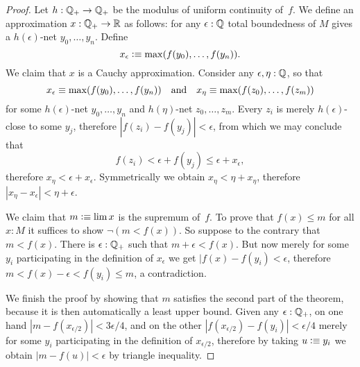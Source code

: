 \begin{proof}
  Let $h : \mathbb{Q}_{+} \to \mathbb{Q}_{+}$ be the modulus of uniform continuity of~$f$.
  We define an approximation $x : \mathbb{Q}_{+} \to \mathbb{R}$ as follows: for any $\epsilon : \mathbb{Q}$ total
  boundedness of $M$ gives a $h(\epsilon)$-net $y_0, \ldots, y_n$. Define
  \begin{equation*}
    x_\epsilon \vcentcolon\equiv \max (f(y_0), \ldots, f(y_n)).
  \end{equation*}
  We claim that $x$ is a Cauchy approximation. Consider any $\epsilon, \eta : \mathbb{Q}$, so that
  \begin{equation*}
    x_\epsilon \equiv \max (f(y_0), \ldots, f(y_n))
    \quad\text{and}\quad
    x_\eta \equiv \max (f(z_0), \ldots, f(z_m))
  \end{equation*}
  for some $h(\epsilon)$-net $y_0, \ldots, y_n$ and $h(\eta)$-net $z_0, \ldots, z_m$.
  Every $z_i$ is merely $h(\epsilon)$-close to some $y_j$, therefore $|f(z_i) - f(y_j)| <
  \epsilon$, from which we may conclude that
  \begin{equation*}
    f(z_i) < \epsilon + f(y_j) \leq \epsilon + x_\epsilon,
  \end{equation*}
  therefore $x_\eta < \epsilon + x_\epsilon$. Symmetrically we obtain $x_\eta < \eta +
  x_\eta$, therefore $|x_\eta - x_\epsilon| < \eta + \epsilon$.

  We claim that $m \vcentcolon\equiv \lim x$ is the supremum of~$f$. To prove that $f(x) \leq m$ for
  all $x : M$ it suffices to show $\lnot (m < f(x))$. So suppose to the contrary that $m <
  f(x)$. There is $\epsilon : \mathbb{Q}_{+}$ such that $m + \epsilon < f(x)$. But now merely for
  some $y_i$ participating in the definition of $x_\epsilon$ we get $|f(x) - f(y_i) <
  \epsilon$, therefore $m < f(x) - \epsilon < f(y_i) \leq m$, a contradiction.

  We finish the proof by showing that $m$ satisfies the second part of the theorem, because
  it is then automatically a least upper bound. Given any $\epsilon : \mathbb{Q}_{+}$, on one hand
  $|m - f(x_{\epsilon/2})| < 3 \epsilon/4$, and on the other $|f(x_{\epsilon/2}) - f(y_i)| <
  \epsilon/4$ merely for some $y_i$ participating in the definition of $x_{\epsilon/2}$,
  therefore by taking $u \vcentcolon\equiv y_i$ we obtain $|m - f(u)| < \epsilon$ by triangle
  inequality.
\end{proof}


